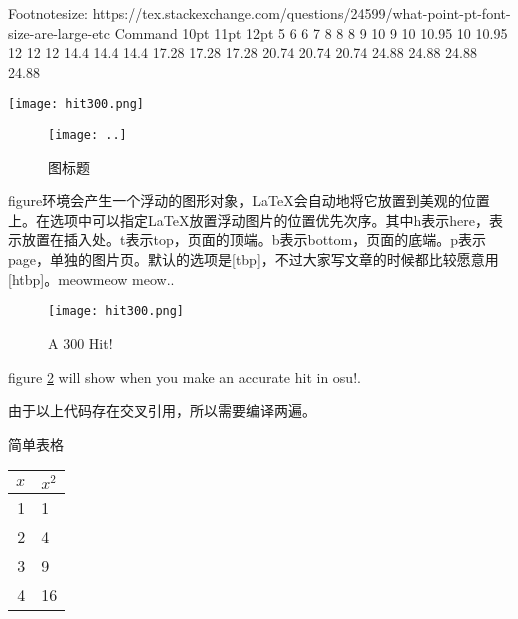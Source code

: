 \usepackage{enumitem}  %
\begin{enumerate}[fullwidth,itemindent=2em,label=(\arabic*)]

Footnotesize:
https://tex.stackexchange.com/questions/24599/what-point-pt-font-size-are-large-etc
Command             10pt    11pt    12pt
\tiny               5       6       6
\scriptsize         7       8       8
\footnotesize       8       9       10
\small              9       10      10.95
\normalsize         10      10.95   12
\large              12      12      14.4
\Large              14.4    14.4    17.28
\LARGE              17.28   17.28   20.74
\huge               20.74   20.74   24.88
\Huge               24.88   24.88   24.88


\usepackage{graphicx}
\texttt{[image: hit300.png]}



\begin{figure}[选项]
\centering %
\texttt{[image: ..]}
\caption{图标题}
\label{供引用的标签}
\end{figure}figure环境会产生一个浮动的图形对象，LaTeX会自动地将它放置到美观的位置上。在选项中可以指定LaTeX放置浮动图片的位置优先次序。其中h表示here，表示放置在插入处。t表示top，页面的顶端。b表示bottom，页面的底端。p表示page，单独的图片页。默认的选项是[tbp]，不过大家写文章的时候都比较愿意用[htbp]。meowmeow meow..
\begin{figure}[htbp]
\centering
\texttt{[image: hit300.png]}
\caption{A 300 Hit!}
\label{fig:300}
\end{figure}

figure \ref{fig:300} will show when you make an accurate hit in osu!.

由于以上代码存在交叉引用，所以需要编译两遍。

简单表格
\begin{tabular}{|r||l|}
    \hline
    $x$ & $x^2$ \\
    \hline \hline
    1 & 1  \\ \hline
    2 & 4  \\ \cline{1-1}
    3 & 9  \\ \hline
    4 & 16 \\ \hline
\end{tabular}


\end{enumerate}
